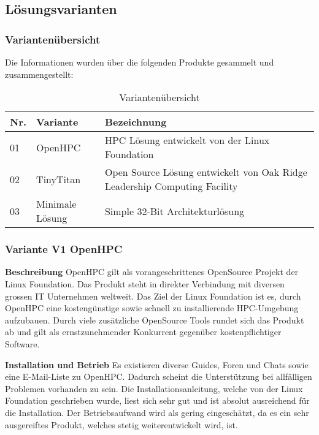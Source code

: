 
\subsection{Lösungsvarianten}
\subsubsection{Variantenübersicht}

Die Informationen wurden über die folgenden Produkte gesammelt und zusammengestellt:

\begin{table}[H]
\centering
\begin{tabular}{p{1cm}p{4cm}p{11cm}}
\hline
\rowcolor{heading} \textbf{Nr.} & \textbf{Variante} & \textbf{Bezeichnung} \\\hline
01 & OpenHPC & HPC Lösung entwickelt von der Linux Foundation \\\hline
02 & TinyTitan & Open Source Lösung entwickelt von Oak Ridge Leadership Computing Facility \\\hline
03 & Minimale Lösung & Simple 32-Bit Architekturlösung \\\hline
\end{tabular}
\caption{Variantenübersicht}
\end{table}

\subsubsection{Variante V1 \flqq OpenHPC\frqq}

\textbf{Beschreibung}\newline
OpenHPC gilt als vorangeschrittenes OpenSource Projekt der Linux Foundation. Das Produkt steht in direkter Verbindung mit diversen grossen IT Unternehmen weltweit. Das Ziel der Linux Foundation ist es, durch OpenHPC eine kostengünstige sowie schnell zu installierende HPC-Umgebung aufzubauen. Durch viele zusätzliche OpenSource Tools rundet sich das Produkt ab und gilt als ernstzunehmender Konkurrent gegenüber kostenpflichtiger Software.

\textbf{Installation und Betrieb}\newline
Es existieren diverse Guides, Foren und Chats sowie eine E-Mail-Liste zu OpenHPC. Dadurch scheint die Unterstützung bei allfälligen Problemen vorhanden zu sein. Die Installationsanleitung, welche von der Linux Foundation geschrieben wurde, liest sich sehr gut und ist absolut ausreichend für die Installation. Der Betriebsaufwand wird als gering eingeschätzt, da es ein sehr ausgereiftes Produkt, welches stetig weiterentwickelt wird, ist.

